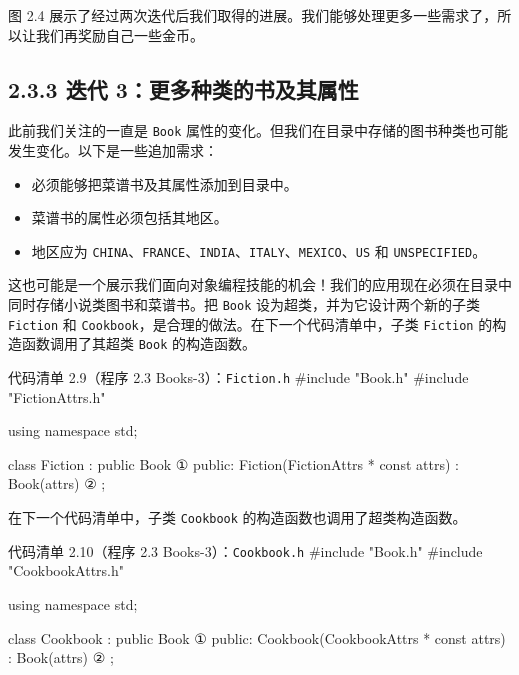 图 2.4 展示了经过两次迭代后我们取得的进展。我们能够处理更多一些需求了，所以让我们再奖励自己一些金币。


\subsection{2.3.3 迭代 3：更多种类的书及其属性}

此前我们关注的一直是 \texttt{Book} 属性的变化。但我们在目录中存储的图书种类也可能发生变化。以下是一些追加需求：

\begin{itemize}
\item 必须能够把菜谱书及其属性添加到目录中。
\item 菜谱书的属性必须包括其地区。
\item 地区应为 \texttt{CHINA}、\texttt{FRANCE}、\texttt{INDIA}、\texttt{ITALY}、\texttt{MEXICO}、\texttt{US} 和 \texttt{UNSPECIFIED}。
\end{itemize}

这也可能是一个展示我们面向对象编程技能的机会！我们的应用现在必须在目录中同时存储小说类图书和菜谱书。把 \texttt{Book} 设为超类，并为它设计两个新的子类 \texttt{Fiction} 和 \texttt{Cookbook}，是合理的做法。在下一个代码清单中，子类 \texttt{Fiction} 的构造函数调用了其超类 \texttt{Book} 的构造函数。

\begin{codeboxt}{代码清单 2.9（程序 2.3 Books-3）：\texttt{Fiction.h}}
#include "Book.h"
#include "FictionAttrs.h"

using namespace std;

class Fiction : public Book                              ①
{
public:
    Fiction(FictionAttrs * const attrs) : Book(attrs) {} ②
};
\end{codeboxt}
\par
{}\par

在下一个代码清单中，子类 \texttt{Cookbook} 的构造函数也调用了超类构造函数。

\begin{codeboxt}{代码清单 2.10（程序 2.3 Books-3）：\texttt{Cookbook.\allowbreak{}h}}
#include "Book.h"
#include "CookbookAttrs.h"

using namespace std;

class Cookbook : public Book                               ①
{
public:
    Cookbook(CookbookAttrs * const attrs) : Book(attrs) {} ②
};
\end{codeboxt}
\par
{}\par

